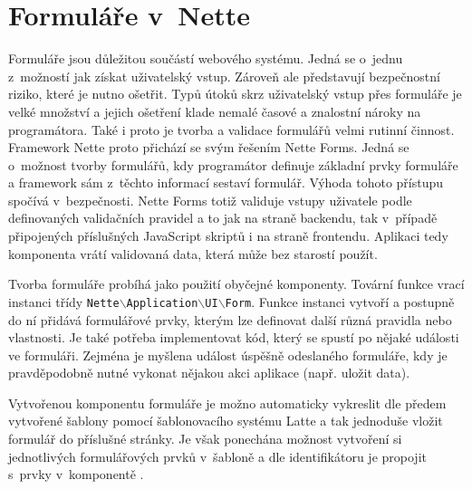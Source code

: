 \documentclass[czech,BP]{thesiskiv}
\begin{document}
		\section{Formuláře v~Nette}
		\par Formuláře jsou důležitou součástí webového systému. Jedná se o~jednu z~možností jak získat uživatelský vstup. Zároveň ale představují bezpečnostní riziko, které je nutno ošetřit. Typů útoků skrz uživatelský vstup přes formuláře je velké množství a jejich ošetření klade nemalé časové a znalostní nároky na programátora. Také i proto je tvorba a validace formulářů velmi rutinní činnost. Framework Nette proto přichází se svým řešením Nette Forms. Jedná se o~možnost tvorby formulářů, kdy programátor definuje základní prvky formuláře a framework sám z~těchto informací sestaví formulář. Výhoda tohoto přístupu spočívá v~bezpečnosti. Nette Forms totiž validuje vstupy uživatele podle definovaných validačních pravidel a to jak na straně backendu, tak v~případě připojených příslušných JavaScript skriptů i na straně frontendu. Aplikaci tedy komponenta vrátí validovaná data, která může bez starostí použít.
		\par Tvorba formuláře probíhá jako použití obyčejné komponenty. Tovární funkce vrací instanci třídy \texttt{Nette$\backslash$Application$\backslash$UI$\backslash$Form}. Funkce instanci vytvoří a postupně do ní přidává formulářové prvky, kterým lze definovat další různá pravidla nebo vlastnosti. Je také potřeba implementovat kód, který se spustí po nějaké události ve formuláři. Zejména je myšlena událost úspěšně odeslaného formuláře, kdy je pravděpodobně nutné vykonat nějakou akci aplikace (např. uložit data).
		\par Vytvořenou komponentu formuláře je možno automaticky vykreslit dle předem vytvořené šablony pomocí šablonovacího systému Latte a tak jednoduše vložit formulář do příslušné stránky. Je však ponechána možnost vytvoření si jednotlivých formulářových prvků v~šabloně a dle identifikátoru je propojit s~prvky v~komponentě \cite{NetteDI}.
		
\end{document}
